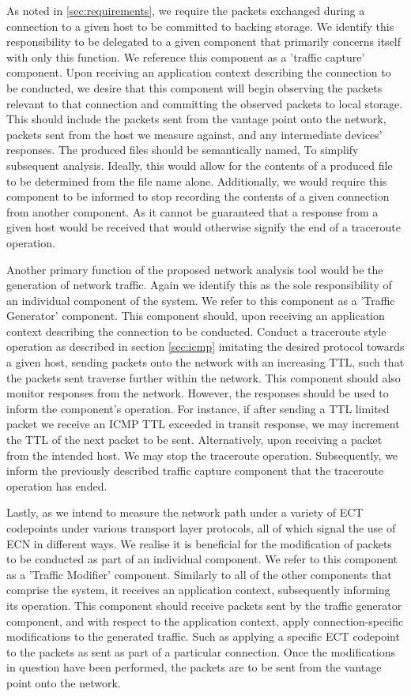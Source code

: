 \documentclass{l4proj}
\begin{document}
As noted in \ref{sec:requirements}, we require the packets exchanged during a connection to a given host to be committed to backing storage. We identify this responsibility to be delegated to a given component that primarily concerns itself with only this function. We reference this component as a 'traffic capture' component. Upon receiving an application context describing the connection to be conducted, we desire that this component will begin observing the packets relevant to that connection and committing the observed packets to local storage. This should include the packets sent from the vantage point onto the network, packets sent from the host we measure against, and any intermediate devices' responses. The produced files should be semantically named, To simplify subsequent analysis. Ideally, this would allow for the contents of a produced file to be determined from the file name alone. Additionally, we would require this component to be informed to stop recording the contents of a given connection from another component. As it cannot be guaranteed that a response from a given host would be received that would otherwise signify the end of a traceroute operation.

Another primary function of the proposed network analysis tool would be the generation of network traffic. Again we identify this as the sole responsibility of an individual component of the system. We refer to this component as a 'Traffic Generator' component. This component should, upon receiving an application context describing the connection to be conducted. Conduct a traceroute style operation as described in section \ref{sec:icmp} imitating the desired protocol towards a given host, sending packets onto the network with an increasing TTL, such that the packets sent traverse further within the network. This component should also monitor responses from the network. However, the responses should be used to inform the component's operation. For instance, if after sending a TTL limited packet we receive an ICMP TTL exceeded in transit response, we may increment the TTL of the next packet to be sent. Alternatively, upon receiving a packet from the intended host. We may stop the traceroute operation. Subsequently, we inform the previously described traffic capture component that the traceroute operation has ended.

Lastly, as we intend to measure the network path under a variety of ECT codepoints under various transport layer protocols, all of which signal the use of ECN in different ways. We realise it is beneficial for the modification of packets to be conducted as part of an individual component. We refer to this component as a 'Traffic Modifier' component. Similarly to all of the other components that comprise the system, it receives an application context, subsequently informing its operation. This component should receive packets sent by the traffic generator component, and with respect to the application context, apply connection-specific modifications to the generated traffic. Such as applying a specific ECT codepoint to the packets as sent as part of a particular connection. Once the modifications in question have been performed, the packets are to be sent from the vantage point onto the network.
\end{document}
